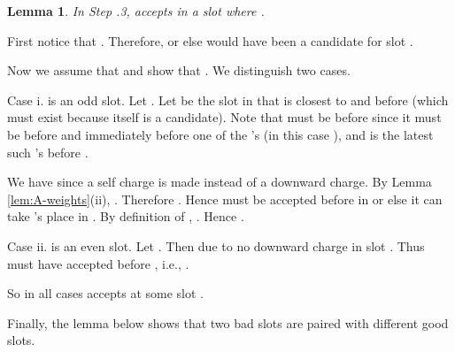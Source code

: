 \documentclass[11pt]{article}
\newtheorem{lemma}{Lemma}[section]
\newcommand{\qed}{\hspace*{\fill}\par\medskip}
\newenvironment{proof}{\noindent{\it Proof. }\ignorespaces}{\qed}
\begin{document}
\begin{lemma} \label{lem:case3}
In Step .3,  accepts  in a slot  where .
\end{lemma}
\begin{proof}
First notice that .
Therefore, 
or else  would have been a candidate for slot .

Now we assume that  and show that .
We distinguish two cases.

Case i.   is an odd slot.  
Let .
Let  be the slot in 
that is closest to and before  
(which must exist because  itself is a candidate).
Note that  must be before  since it must be 
before  and immediately before one of the 's
(in this case ), and  is the latest such
's before .  

\begin{figure}[h]
\centerline{ \epsfysize=1in  }
\label{fig:s3}
\end{figure}

We have  since a self charge is made instead of a 
downward charge.
By Lemma \ref{lem:A-weights}(ii), .  
Therefore .
Hence  must be accepted before  
in  or else it can take 's place in .
By definition of , .
Hence .

Case ii.   is an even slot. 
Let .
Then  due to no downward charge in slot .  
Thus  must have accepted
 before , i.e., .

So in all cases  accepts  at some slot . 
\end{proof}


Finally, the lemma below shows that
two bad slots are paired with different good slots.
\end{document}
